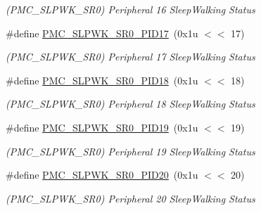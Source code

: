 \begin{DoxyCompactItemize}
\begin{DoxyCompactList}\small\item\em (P\+M\+C\+\_\+\+S\+L\+P\+W\+K\+\_\+\+S\+R0) Peripheral 16 Sleep\+Walking Status \end{DoxyCompactList}\item 
\mbox{\label{group__SAME70__PMC_ga2662e927c76b108955331e8e4c4b896b}} 
\#define \mbox{\hyperlink{group__SAME70__PMC_ga2662e927c76b108955331e8e4c4b896b}{P\+M\+C\+\_\+\+S\+L\+P\+W\+K\+\_\+\+S\+R0\+\_\+\+P\+I\+D17}}~(0x1u $<$$<$ 17)
\begin{DoxyCompactList}\small\item\em (P\+M\+C\+\_\+\+S\+L\+P\+W\+K\+\_\+\+S\+R0) Peripheral 17 Sleep\+Walking Status \end{DoxyCompactList}\item 
\mbox{\label{group__SAME70__PMC_ga013a82b5c2815f2e52d14b6f6dc2b666}} 
\#define \mbox{\hyperlink{group__SAME70__PMC_ga013a82b5c2815f2e52d14b6f6dc2b666}{P\+M\+C\+\_\+\+S\+L\+P\+W\+K\+\_\+\+S\+R0\+\_\+\+P\+I\+D18}}~(0x1u $<$$<$ 18)
\begin{DoxyCompactList}\small\item\em (P\+M\+C\+\_\+\+S\+L\+P\+W\+K\+\_\+\+S\+R0) Peripheral 18 Sleep\+Walking Status \end{DoxyCompactList}\item 
\mbox{\label{group__SAME70__PMC_ga9fcc0ae06dfed9fc15d2e33f7e4ca0da}} 
\#define \mbox{\hyperlink{group__SAME70__PMC_ga9fcc0ae06dfed9fc15d2e33f7e4ca0da}{P\+M\+C\+\_\+\+S\+L\+P\+W\+K\+\_\+\+S\+R0\+\_\+\+P\+I\+D19}}~(0x1u $<$$<$ 19)
\begin{DoxyCompactList}\small\item\em (P\+M\+C\+\_\+\+S\+L\+P\+W\+K\+\_\+\+S\+R0) Peripheral 19 Sleep\+Walking Status \end{DoxyCompactList}\item 
\mbox{\label{group__SAME70__PMC_gaf4e8c136943976671775a545e578f501}} 
\#define \mbox{\hyperlink{group__SAME70__PMC_gaf4e8c136943976671775a545e578f501}{P\+M\+C\+\_\+\+S\+L\+P\+W\+K\+\_\+\+S\+R0\+\_\+\+P\+I\+D20}}~(0x1u $<$$<$ 20)
\begin{DoxyCompactList}\small\item\em (P\+M\+C\+\_\+\+S\+L\+P\+W\+K\+\_\+\+S\+R0) Peripheral 20 Sleep\+Walking Status \end{DoxyCompactList}\item 

\end{DoxyCompactItemize}
